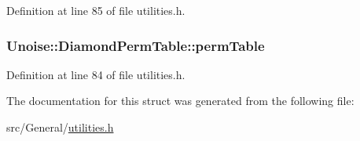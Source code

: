 Definition at line 85 of file utilities.\-h.

\hypertarget{struct_unoise_1_1_diamond_perm_table_abbdd2c631912b46dd642a1742fafc2cc}{
\subsubsection[{perm\-Table}]{ Unoise\-::\-Diamond\-Perm\-Table\-::perm\-Table}}\label{struct_unoise_1_1_diamond_perm_table_abbdd2c631912b46dd642a1742fafc2cc}


Definition at line 84 of file utilities.\-h.



The documentation for this struct was generated from the following file\-:\begin{DoxyCompactItemize}
\item 
src/\-General/\hyperlink{utilities_8h}{utilities.\-h}\end{DoxyCompactItemize}
